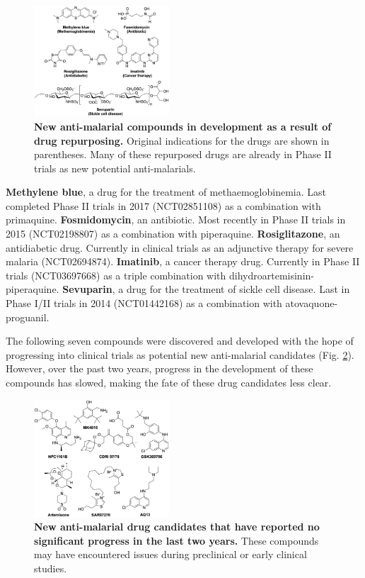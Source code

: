 \documentclass[twocolumn]{bmcart}%
\begin{document}
\begin{figure}[h!]
	\includegraphics [width=0.45\textwidth] {Figure4}
	\caption{{\bf New anti-malarial compounds in development as a result of drug repurposing.} Original indications for the drugs are shown in parentheses. Many of these repurposed drugs are already in Phase II trials as new potential anti-malarials.}
	\label{Figure4}
\end{figure}

\textbf{Methylene blue}, a drug for the treatment of methaemoglobinemia. Last completed Phase II trials in 2017 (NCT02851108) as a combination with primaquine. \textbf{Fosmidomycin}, an antibiotic. Most recently in Phase II trials in 2015 (NCT02198807) as a combination with piperaquine. \textbf{Rosiglitazone}, an antidiabetic drug. Currently in clinical trials as an adjunctive therapy for severe malaria (NCT02694874). \textbf{Imatinib}, a cancer therapy drug. Currently in Phase II trials (NCT03697668) as a triple combination with dihydroartemisinin-piperaquine. \textbf{Sevuparin}, a drug for the treatment of sickle cell disease. Last in Phase I/II trials in 2014 (NCT01442168) as a combination with atovaquone-proguanil.	

The following seven compounds were discovered and developed with the hope of progressing into clinical trials as potential new anti-malarial candidates (Fig. \ref{Figure5}). However, over the past two years, progress in the development of these compounds has slowed, making the fate of these drug candidates less clear.

\begin{figure}[h]
	\includegraphics [width=0.45\textwidth] {Figure5}
	\caption{{\bf New anti-malarial drug candidates that have reported no significant progress in the last two years.} These compounds may have encountered issues during preclinical or early clinical studies.}
	\label{Figure5}
\end{figure}
\end{document}
